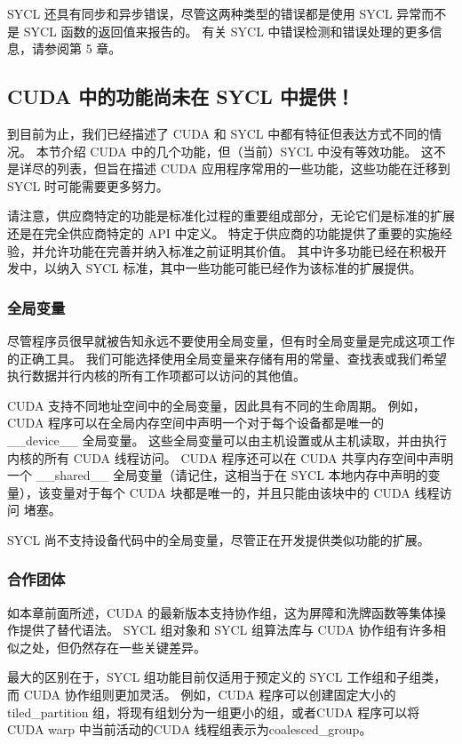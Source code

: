 SYCL 还具有同步和异步错误，尽管这两种类型的错误都是使用 SYCL 异常而不是 SYCL 函数的返回值来报告的。 有关 SYCL 中错误检测和错误处理的更多信息，请参阅第 5 章。

\subsection{CUDA 中的功能尚未在 SYCL 中提供！}
到目前为止，我们已经描述了 CUDA 和 SYCL 中都有特征但表达方式不同的情况。 本节介绍 CUDA 中的几个功能，但（当前）SYCL 中没有等效功能。 这不是详尽的列表，但旨在描述 CUDA 应用程序常用的一些功能，这些功能在迁移到 SYCL 时可能需要更多努力。

请注意，供应商特定的功能是标准化过程的重要组成部分，无论它们是标准的扩展还是在完全供应商特定的 API 中定义。 特定于供应商的功能提供了重要的实施经验，并允许功能在完善并纳入标准之前证明其价值。 其中许多功能已经在积极开发中，以纳入 SYCL 标准，其中一些功能可能已经作为该标准的扩展提供。

\subsubsection{全局变量}
尽管程序员很早就被告知永远不要使用全局变量，但有时全局变量是完成这项工作的正确工具。 我们可能选择使用全局变量来存储有用的常量、查找表或我们希望执行数据并行内核的所有工作项都可以访问的其他值。

CUDA 支持不同地址空间中的全局变量，因此具有不同的生命周期。 例如，CUDA 程序可以在全局内存空间中声明一个对于每个设备都是唯一的 \_\_device\_\_ 全局变量。 这些全局变量可以由主机设置或从主机读取，并由执行内核的所有 CUDA 线程访问。 CUDA 程序还可以在 CUDA 共享内存空间中声明一个 \_\_shared\_\_ 全局变量（请记住，这相当于在 SYCL 本地内存中声明的变量），该变量对于每个 CUDA 块都是唯一的，并且只能由该块中的 CUDA 线程访问 堵塞。

SYCL 尚不支持设备代码中的全局变量，尽管正在开发提供类似功能的扩展。

\subsubsection{合作团体}
如本章前面所述，CUDA 的最新版本支持协作组，这为屏障和洗牌函数等集体操作提供了替代语法。 SYCL 组对象和 SYCL 组算法库与 CUDA 协作组有许多相似之处，但仍然存在一些关键差异。

最大的区别在于，SYCL 组功能目前仅适用于预定义的 SYCL 工作组和子组类，而 CUDA 协作组则更加灵活。 例如，CUDA 程序可以创建固定大小的tiled\_partition 组，将现有组划分为一组更小的组，或者CUDA 程序可以将CUDA warp 中当前活动的CUDA 线程组表示为coalesced\_group。

